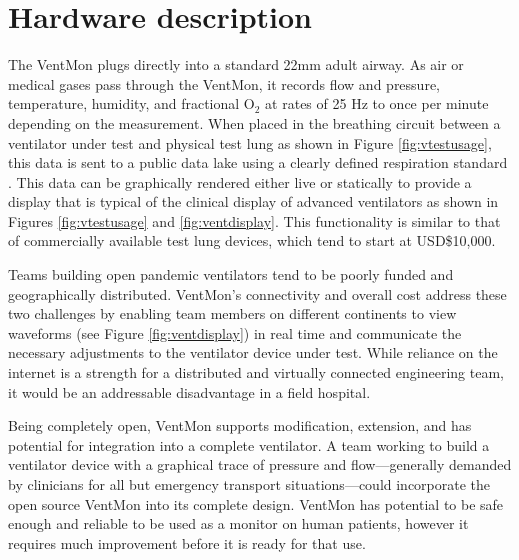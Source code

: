 \documentclass[11pt, letterpaper]{article}
\begin{document}
\section{Hardware description}


The VentMon plugs directly into a standard 22mm adult airway. As air or medical gases pass through the VentMon, it records flow and pressure, temperature, humidity, and fractional O$_2$ at rates of 25 Hz to once per minute depending on the measurement. When placed in the breathing circuit between a ventilator under test and physical test lung as shown in Figure \ref{fig:vtestusage}, this data is sent to a public data lake \cite{VentDisplay} using a clearly defined respiration standard \cite{PIRDS}. This data can be graphically rendered either live or statically to provide a display that is typical of the clinical display of advanced ventilators as shown in Figures \ref{fig:vtestusage} and \ref{fig:ventdisplay}. This functionality is similar to that of commercially available test lung devices, which tend to start at USD\$10,000.

Teams building open pandemic ventilators tend to be poorly funded and geographically distributed. VentMon's connectivity and overall cost address these two challenges by enabling team members on different continents to view waveforms (see Figure  \ref{fig:ventdisplay}) in real time and communicate the necessary adjustments to the ventilator device under test. While reliance on the internet is a strength for a distributed and virtually connected engineering team, it would be an addressable disadvantage in a field hospital.

Being completely open, VentMon supports modification, extension, and has potential for integration into a complete ventilator. A team working to build a ventilator device with a graphical trace of pressure and flow---generally demanded by clinicians for all but emergency transport situations---could incorporate the open source VentMon into its complete design. VentMon has potential to be safe enough and reliable to be used as a monitor on human patients, however it requires much improvement before it is ready for that use.
\\
\end{document}
